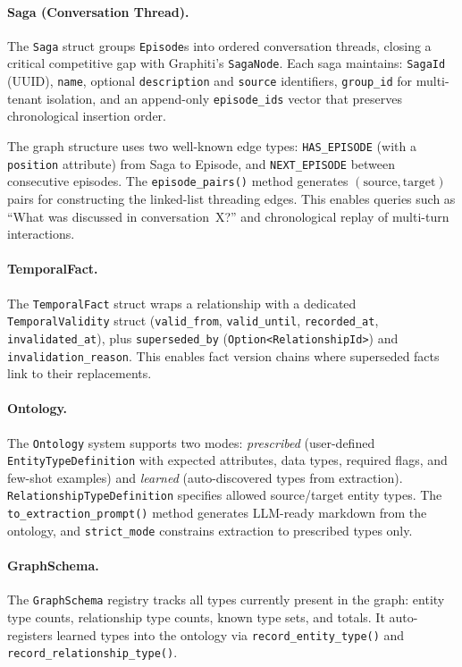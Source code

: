 \documentclass[11pt,a4paper,twocolumn]{article}
\begin{document}
\paragraph{Saga (Conversation Thread).}
The \texttt{Saga} struct groups \texttt{Episode}s into ordered
conversation threads, closing a critical competitive gap with
Graphiti's \texttt{SagaNode}. Each saga maintains: \texttt{SagaId}
(UUID), \texttt{name}, optional \texttt{description} and
\texttt{source} identifiers, \texttt{group\_id} for multi-tenant
isolation, and an append-only \texttt{episode\_ids} vector that
preserves chronological insertion order.

The graph structure uses two well-known edge types:
\texttt{HAS\_EPISODE} (with a \texttt{position} attribute) from
Saga to Episode, and \texttt{NEXT\_EPISODE} between consecutive
episodes. The \texttt{episode\_pairs()} method generates
$(\text{source}, \text{target})$ pairs for constructing the
linked-list threading edges. This enables queries such as ``What
was discussed in conversation~X?'' and chronological replay of
multi-turn interactions.

\paragraph{TemporalFact.}
The \texttt{TemporalFact} struct wraps a relationship with a
dedicated \texttt{TemporalValidity} struct (\texttt{valid\_from},
\texttt{valid\_until}, \texttt{recorded\_at},
\texttt{invalidated\_at}), plus \texttt{superseded\_by}
(\texttt{Option<RelationshipId>}) and
\texttt{invalidation\_reason}. This enables fact version chains
where superseded facts link to their replacements.

\paragraph{Ontology.}
The \texttt{Ontology} system supports two modes:
\emph{prescribed} (user-defined \texttt{EntityTypeDefinition}
with expected attributes, data types, required flags, and
few-shot examples) and \emph{learned} (auto-discovered types
from extraction). \texttt{RelationshipTypeDefinition} specifies
allowed source/target entity types. The \texttt{to\_extraction\_prompt()}
method generates LLM-ready markdown from the ontology, and
\texttt{strict\_mode} constrains extraction to prescribed types only.

\paragraph{GraphSchema.}
The \texttt{GraphSchema} registry tracks all types currently present
in the graph: entity type counts, relationship type counts, known
type sets, and totals. It auto-registers learned types into the
ontology via \texttt{record\_entity\_type()} and
\texttt{record\_relationship\_type()}.
\end{document}
